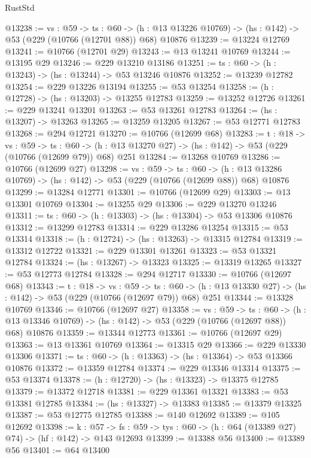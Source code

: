 \begin{lexlean}{RustStd}
\begin{coremodule}
@13238 := {vs : @59} ->
  {ts : @60} ->
  (h : @13 @13226 @10769) -> (hs : @142) -> @53 (@229 (@10766 (@12701 @88)) @68) @10876
@13239 := @13224 @12769
@13241 := @10766 (@12701 @29)
@13243 := @13 @13241 @10769
@13244 := @13195 @29
@13246 := @229 @13210 @13186
@13251 := {ts : @60} -> (h : @13243) -> (hs : @13244) -> @53 @13246 @10876
@13252 := @13239 @12782
@13254 := @229 @13226 @13194
@13255 := @53 @13254
@13258 := (h : @12728) -> (hs : @13203) -> @13255 @12783
@13259 := @13252 @12726
@13261 := @229 @13241 @13201
@13263 := @53 @13261 @12783
@13264 := (hs : @13207) -> @13263
@13265 := @13259 @13205
@13267 := @53 @12771 @12783
@13268 := @294 @12721
@13270 := @10766 (@12699 @68)
@13283 := {t : @18} ->
  {vs : @59} ->
  {ts : @60} -> (h : @13 @13270 @27) -> (hs : @142) -> @53 (@229 (@10766 (@12699 @79)) @68) @251
@13284 := @13268 @10769
@13286 := @10766 (@12699 @27)
@13298 := {vs : @59} ->
  {ts : @60} ->
  (h : @13 @13286 @10769) -> (hs : @142) -> @53 (@229 (@10766 (@12699 @88)) @68) @10876
@13299 := @13284 @12771
@13301 := @10766 (@12699 @29)
@13303 := @13 @13301 @10769
@13304 := @13255 @29
@13306 := @229 @13270 @13246
@13311 := {ts : @60} -> (h : @13303) -> (hs : @13304) -> @53 @13306 @10876
@13312 := @13299 @12783
@13314 := @229 @13286 @13254
@13315 := @53 @13314
@13318 := (h : @12724) -> (hs : @13263) -> @13315 @12784
@13319 := @13312 @12722
@13321 := @229 @13301 @13261
@13323 := @53 @13321 @12784
@13324 := (hs : @13267) -> @13323
@13325 := @13319 @13265
@13327 := @53 @12773 @12784
@13328 := @294 @12717
@13330 := @10766 (@12697 @68)
@13343 := {t : @18} ->
  {vs : @59} ->
  {ts : @60} -> (h : @13 @13330 @27) -> (hs : @142) -> @53 (@229 (@10766 (@12697 @79)) @68) @251
@13344 := @13328 @10769
@13346 := @10766 (@12697 @27)
@13358 := {vs : @59} ->
  {ts : @60} ->
  (h : @13 @13346 @10769) -> (hs : @142) -> @53 (@229 (@10766 (@12697 @88)) @68) @10876
@13359 := @13344 @12773
@13361 := @10766 (@12697 @29)
@13363 := @13 @13361 @10769
@13364 := @13315 @29
@13366 := @229 @13330 @13306
@13371 := {ts : @60} -> (h : @13363) -> (hs : @13364) -> @53 @13366 @10876
@13372 := @13359 @12784
@13374 := @229 @13346 @13314
@13375 := @53 @13374
@13378 := (h : @12720) -> (hs : @13323) -> @13375 @12785
@13379 := @13372 @12718
@13381 := @229 @13361 @13321
@13383 := @53 @13381 @12785
@13384 := (hs : @13327) -> @13383
@13385 := @13379 @13325
@13387 := @53 @12775 @12785
@13388 := @140 @12692
@13389 := @105 @12692
@13398 := {k : @57} ->
  {fs : @59} -> {tys : @60} -> (h : @64 (@13389 @27) @74) -> (hf : @142) -> @143 @12693
@13399 := @13388 @56
@13400 := @13389 @56
@13401 := @64 @13400

\end{coremodule}
\end{lexlean}
